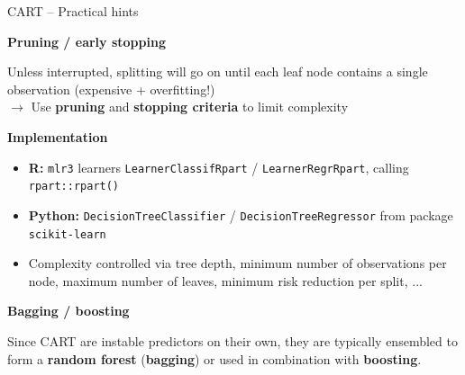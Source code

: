 \documentclass[11pt,compress,t,notes=noshow, xcolor=table]{beamer}
\newcommand{\highlight}[1]{\textcolor{highlightcol}{\textbf{#1}}}
\let\code=\texttt
\begin{document}
\begin{frame}{CART -- Practical hints}

\footnotesize

\highlight{Pruning / early stopping}

Unless interrupted, splitting will go on until each leaf node contains a single 
observation (expensive + overfitting!) \\
\smallskip
$\rightarrow$ Use \textbf{pruning} and \textbf{stopping criteria} to limit 
complexity

\medskip

\highlight{Implementation}
\begin{itemize}
  \item \textbf{R:} \code{mlr3} learners \code{LearnerClassifRpart} / 
    \code{LearnerRegrRpart}, calling \code{rpart::rpart()}
  \item \textbf{Python:} \code{DecisionTreeClassifier} / 
  \code{DecisionTreeRegressor} from package \code{scikit-learn}
  \item Complexity controlled via tree depth, minimum number of observations 
  per node, maximum number of leaves, minimum risk reduction per split, ...
\end{itemize}

\medskip

\highlight{Bagging / boosting} 

Since CART are instable predictors on their own, they are typically ensembled
to form a \textbf{random forest} (\textbf{bagging}) or used in combination with 
\textbf{boosting}.

\end{frame}

\end{document}
